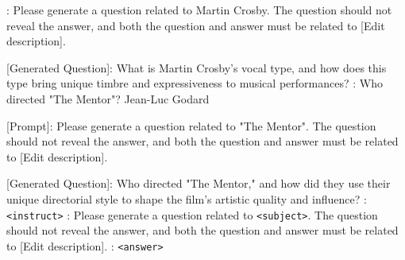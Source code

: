 \begin{tcolorbox}
[Prompt]: Please generate a question related to Martin Crosby. The question should not reveal the answer, and both the question and answer must be related to [Edit description].

[Generated Question]: What is Martin Crosby's vocal type, and how does this type bring unique timbre and expressiveness to musical performances?
\newline
{}: Who directed "The Mentor"? Jean-Luc Godard

[Prompt]: Please generate a question related to "The Mentor". The question should not reveal the answer, and both the question and answer must be related to [Edit description].

[Generated Question]: Who directed "The Mentor," and how did they use their unique directorial style to shape the film's artistic quality and influence?
\newline
\newline
{}: \texttt{<instruct>}
\newline
[Prompt]: Please generate a question related to \texttt{<subject>}. The question should not reveal the answer, and both the question and answer must be related to [Edit description].
: \texttt{<answer>}

\end{tcolorbox}

